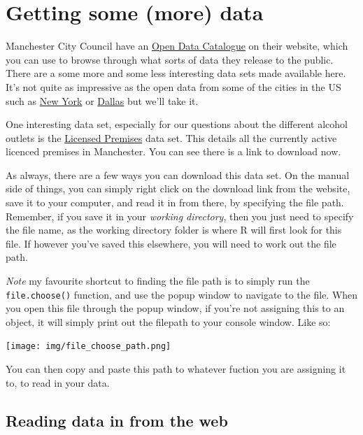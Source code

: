 \documentclass[]{book}
\begin{document}
\hypertarget{getting-some-more-data}{%
\section{Getting some (more) data}\label{getting-some-more-data}}

Manchester City Council have an \href{http://open.manchester.gov.uk/open/homepage/3/manchester_open_data_catalogue}{Open Data Catalogue} on their website, which you can use to browse through what sorts of data they release to the public. There are a some more and some less interesting data sets made available here. It's not quite as impressive as the open data from some of the cities in the US such as \href{https://opendata.cityofnewyork.us/}{New York} or \href{https://www.dallasopendata.com/}{Dallas} but we'll take it.

One interesting data set, especially for our questions about the different alcohol outlets is the \href{http://www.manchester.gov.uk/open/downloads/file/169/licensed_premises}{Licensed Premises} data set. This details all the currently active licenced premises in Manchester. You can see there is a link to download now.

As always, there are a few ways you can download this data set. On the manual side of things, you can simply right click on the download link from the website, save it to your computer, and read it in from there, by specifying the file path. Remember, if you save it in your \emph{working directory}, then you just need to specify the file name, as the working directory folder is where R will first look for this file. If however you've saved this elsewhere, you will need to work out the file path.

\emph{Note} my favourite shortcut to finding the file path is to simply run the \texttt{file.choose()} function, and use the popup window to navigate to the file. When you open this file through the popup window, if you're not assigning this to an object, it will simply print out the filepath to your console window. Like so:

\texttt{[image: img/file\_choose\_path.png]}

You can then copy and paste this path to whatever fuction you are assigning it to, to read in your data.

\hypertarget{reading-data-in-from-the-web}{%
\subsection{Reading data in from the web}\label{reading-data-in-from-the-web}}
\end{document}
